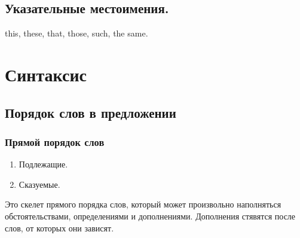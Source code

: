 \documentclass[oneside]{book}
\begin{document}
	\section{Указательные местоимения.}
	this, these, that, those, such, the same.

	\chapter{Синтаксис}
	\section{Порядок слов в предложении}
	\subsection{Прямой порядок слов}
	\begin{enumerate}
		\item Подлежащие.
		
		\item Сказуемые.
	\end{enumerate}

	Это скелет прямого порядка слов, который может произвольно
	наполняться обстоятельствами, определениями и дополнениями.
	Дополнения стявятся после слов, от которых они зависят.
\end{document}
